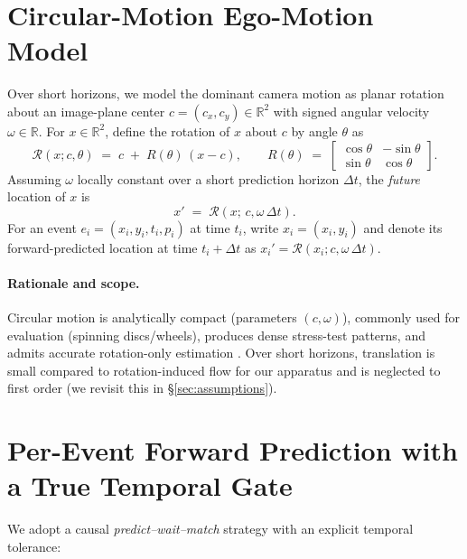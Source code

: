 \section{Circular-Motion Ego-Motion Model}
Over short horizons, we model the dominant camera motion as planar rotation about an image-plane center $c=(c_x,c_y) \in \mathbb{R}^2$ with signed angular velocity $\omega \in \mathbb{R}$. For $x \in \mathbb{R}^2$, define the rotation of $x$ about $c$ by angle $\theta$ as
\begin{equation}
\mathcal{R}(x; c, \theta) \;=\; c \;+\; R(\theta)\,(x-c),
\qquad
R(\theta) \;=\; 
\begin{bmatrix}\cos \theta & -\sin \theta\\ \sin \theta & \cos \theta\end{bmatrix}.
\label{eq:rot-operator}
\end{equation}
Assuming $\omega$ locally constant over a short prediction horizon $\Delta t$, the \emph{future} location of $x$ is
\begin{equation}
x' \;=\; \mathcal{R}\!\left(x;\, c, \omega\,\Delta t\right).
\label{eq:forward-prop}
\end{equation}
For an event $e_i=(x_i,y_i,t_i,p_i)$ at time $t_i$, write $x_i=(x_i,y_i)$ and denote its forward-predicted location at time $t_i+\Delta t$ as $x_i' = \mathcal{R}(x_i; c, \omega\,\Delta t)$.

\paragraph{Rationale and scope.}
Circular motion is analytically compact (parameters $(c,\omega)$), commonly used for evaluation (spinning discs/wheels), produces dense stress-test patterns, and admits accurate rotation-only estimation \cite{Gallego2017Angular,Stoffregen2019Segmentation,Gallego2018CMax}. Over short horizons, translation is small compared to rotation-induced flow for our apparatus and is neglected to first order (we revisit this in \S\ref{sec:assumptions}).

\section{Per-Event Forward Prediction with a True Temporal Gate}
    We adopt a causal \emph{predict–wait–match} strategy with an explicit temporal tolerance:

